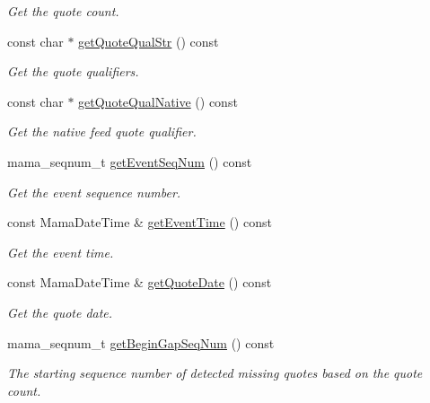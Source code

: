 \begin{CompactItemize}
\begin{CompactList}\small\item\em Get the quote count. \item\end{CompactList}\item 
const char $\ast$ \hyperlink{classWombat_1_1MamdaQuoteListener_e33ca4e1fa76fb882185676c0d865be7}{get\-Quote\-Qual\-Str} () const 
\begin{CompactList}\small\item\em Get the quote qualifiers. \item\end{CompactList}\item 
const char $\ast$ \hyperlink{classWombat_1_1MamdaQuoteListener_b7ff05baca5f30eb44a863e2bed6ce1b}{get\-Quote\-Qual\-Native} () const 
\begin{CompactList}\small\item\em Get the native feed quote qualifier. \item\end{CompactList}\item 
mama\_\-seqnum\_\-t \hyperlink{classWombat_1_1MamdaQuoteListener_fa0883ea81d5b2286d1014616407b690}{get\-Event\-Seq\-Num} () const 
\begin{CompactList}\small\item\em Get the event sequence number. \item\end{CompactList}\item 
const Mama\-Date\-Time \& \hyperlink{classWombat_1_1MamdaQuoteListener_3d5fbd8aa814552de16c665b3eca1dfc}{get\-Event\-Time} () const 
\begin{CompactList}\small\item\em Get the event time. \item\end{CompactList}\item 
const Mama\-Date\-Time \& \hyperlink{classWombat_1_1MamdaQuoteListener_b7fa56da5969989fe36247d8e8d32f3f}{get\-Quote\-Date} () const 
\begin{CompactList}\small\item\em Get the quote date. \item\end{CompactList}\item 
mama\_\-seqnum\_\-t \hyperlink{classWombat_1_1MamdaQuoteListener_d54593507488bdf2f07f532c4eb00549}{get\-Begin\-Gap\-Seq\-Num} () const 
\begin{CompactList}\small\item\em The starting sequence number of detected missing quotes based on the quote count. \item\end{CompactList}\item 

\end{CompactItemize}
